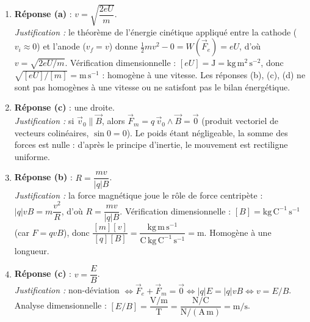 \documentclass[11pt]{article}
\begin{document}
\begin{corrige}
\begin{enumerate}
\item \textbf{Réponse (a)} : $v = \sqrt{\dfrac{2eU}{m}}$.\\
\emph{Justification :} le théorème de l'énergie cinétique appliqué entre la cathode ($v_i \approx 0$) et l'anode ($v_f = v$) donne $\frac{1}{2}mv^2 - 0 = W(\vec{F}_e) = eU$, d'où $v = \sqrt{2eU/m}$. Vérification dimensionnelle : $[eU] = \mathrm{J} = \mathrm{kg\,m^2\,s^{-2}}$, donc $\sqrt{[eU]/[m]} = \mathrm{m\,s^{-1}}$ : homogène à une vitesse. Les réponses (b), (c), (d) ne sont pas homogènes à une vitesse ou ne satisfont pas le bilan énergétique.
\item \textbf{Réponse (c)} : une droite.\\
\emph{Justification :} si $\vec{v}_0 \parallel \vec{B}$, alors $\vec{F}_m = q\,\vec{v}_0\wedge\vec{B} = \vec{0}$ (produit vectoriel de vecteurs colinéaires, $\sin 0 = 0$). Le poids étant négligeable, la somme des forces est nulle : d'après le principe d'inertie, le mouvement est rectiligne uniforme.
\item \textbf{Réponse (b)} : $R = \dfrac{mv}{|q|B}$.\\
\emph{Justification :} la force magnétique joue le rôle de force centripète : $|q|vB = m\dfrac{v^2}{R}$, d'où $R = \dfrac{mv}{|q|B}$. Vérification dimensionnelle : $[B] = \mathrm{kg\,C^{-1}\,s^{-1}}$ (car $F=qvB$), donc $\dfrac{[m][v]}{[q][B]} = \dfrac{\mathrm{kg\,m\,s^{-1}}}{\mathrm{C\,kg\,C^{-1}\,s^{-1}}} = \mathrm{m}$. Homogène à une longueur.
\item \textbf{Réponse (c)} : $v = \dfrac{E}{B}$.\\
\emph{Justification :} non-déviation $\Leftrightarrow \vec{F}_e + \vec{F}_m = \vec{0} \Leftrightarrow |q|E = |q|vB \Leftrightarrow v = E/B$. Analyse dimensionnelle : $[E/B] = \dfrac{\mathrm{V/m}}{\mathrm{T}} = \dfrac{\mathrm{N/C}}{\mathrm{N/(A\,m)}} = \mathrm{m/s}$.
\end{enumerate}
\end{corrige}
\end{document}
